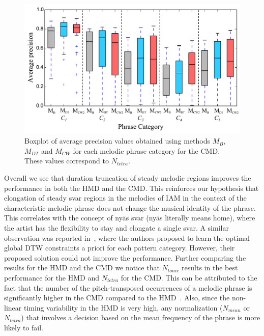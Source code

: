 \begin{figure}
	\begin{center}
		\includegraphics[width=\figSizeEightyFive]{ch06_patterns/figures/ImprovingSimilarity/CarnaticPerCategoryPerformance_BOXPLOT.pdf}
	\end{center}
	\caption{Boxplot of average precision values obtained using methods $M_{B}$, $M_{DT}$ and $M_{CW}$ for each melodic phrase category for the CMD. These values correspond to $N_{tetra}$.}
	\label{fig:carnaticPerCategoryPerformance}
\end{figure}


Overall we see that duration truncation of steady melodic regions improves the performance in both the HMD and the CMD. This reinforces our hypothesis that elongation of steady svar regions in the melodies of IAM in the context of the characteristic melodic phrase does not change the musical identity of the phrase. This correlates with the concept of ny\={a}s svar (ny\={a}s literally means home), where the artist has the flexibility to stay and elongate a single svar. A similar observation was reported in~\cite{Rao2014}, where the authors proposed to learn the optimal global DTW constraints a priori for each pattern category. However, their proposed solution could not improve the performance. Further comparing the results for the HMD and the CMD we notice that $N_{tonic}$ results in the best performance for the HMD and $N_{tetra}$ for the CMD. This can be attributed to the fact that the number of the pitch-transposed occurrences of a melodic phrase is significantly higher in the CMD compared to the HMD~\cite{gulati_ICASSP2015}. Also, since the non-linear timing variability in the HMD is very high, any normalization ($N_{mean}$ or $N_{tetra}$) that involves a decision based on the mean frequency of the phrase is more likely to fail.



